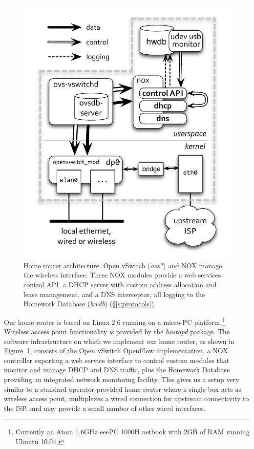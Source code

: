 \begin{figure} 
  \centering 
  \includegraphics[trim=0.5cm 1cm 0.5cm 2.5cm, width=0.5\columnwidth]{architecture}
  \caption{\label{f:architecture}Home router architecture.  Open vSwitch
    (\emph{ovs*}) and NOX manage the wireless interface.  Three NOX modules
    provide a web services control API, a DHCP server with custom address
    allocation and lease management, and a DNS interceptor, all logging to the
    Homework Database (\emph{hwdb}) (\S\ref{s:protocols}). 
}\end{figure}

Our home router is based on Linux 2.6 running on a micro-PC
platform.\footnote{Currently an Atom 1.6GHz eeePC 1000H netbook with 2GB of RAM
  running Ubuntu 10.04.} Wireless access point functionality is provided by the
\emph{hostapd} package.  The software infrastructure on which we implement our
home router, as shown in Figure~\ref{f:architecture}, consists of the Open
vSwitch OpenFlow implementation, a NOX controller exporting a web service
interface to control custom modules that monitor and manage DHCP and DNS
traffic, plus the Homework
Database~\cite{sventek11:_infor_plane_archit_suppor_home_networ_manag} providing
an integrated network monitoring facility.
This gives us a setup very similar to a standard operator-provided home router
where a single box acts as wireless access point, multiplexes a wired
connection for upstream connectivity to the ISP, and may provide a small
number of other wired interfaces. 
  

